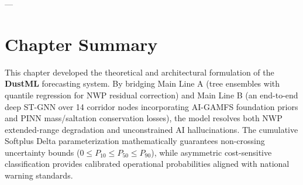 ---

\section{Chapter Summary}
\label{sec:ch4_summary}

This chapter developed the theoretical and architectural formulation of the \textbf{DustML} forecasting system. By bridging Main Line A (tree ensembles with quantile regression for NWP residual correction) and Main Line B (an end-to-end deep ST-GNN over 14 corridor nodes incorporating AI-GAMFS foundation priors and PINN mass/saltation conservation losses), the model resolves both NWP extended-range degradation and unconstrained AI hallucinations. The cumulative Softplus Delta parameterization mathematically guarantees non-crossing uncertainty bounds ($0 \le P_{10} \le P_{50} \le P_{90}$), while asymmetric cost-sensitive classification provides calibrated operational probabilities aligned with national warning standards.
